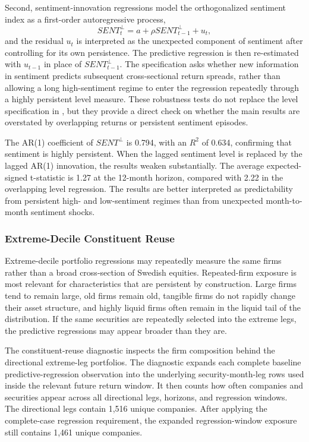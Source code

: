 \documentclass[11pt]{article}
\newcommand{\var}[1]{\ensuremath{#1}}
\begin{document}
Second, sentiment-innovation regressions model the orthogonalized sentiment index as a first-order autoregressive process,
\begin{equation}
    SENT^{\perp}_{t} = a + \rho SENT^{\perp}_{t-1} + u_t,
\end{equation}
and the residual \var{u_t} is interpreted as the unexpected component of sentiment after controlling for its own persistence. The predictive regression is then re-estimated with \var{u_{t-1}} in place of \var{SENT^{\perp}_{t-1}}. The specification asks whether new information in sentiment predicts subsequent cross-sectional return spreads, rather than allowing a long high-sentiment regime to enter the regression repeatedly through a highly persistent level measure. These robustness tests do not replace the level specification in \citet{baker2006sentiment}, but they provide a direct check on whether the main results are overstated by overlapping returns or persistent sentiment episodes.

The AR(1) coefficient of \var{SENT^{\perp}} is 0.794, with an \var{R^2} of 0.634, confirming that sentiment is highly persistent. When the lagged sentiment level is replaced by the lagged AR(1) innovation, the results weaken substantially. The average expected-signed t-statistic is 1.27 at the 12-month horizon, compared with 2.22 in the overlapping level regression. The results are better interpreted as predictability from persistent high- and low-sentiment regimes than from unexpected month-to-month sentiment shocks.

\subsubsection{Extreme-Decile Constituent Reuse}
Extreme-decile portfolio regressions may repeatedly measure the same firms rather than a broad cross-section of Swedish equities. Repeated-firm exposure is most relevant for characteristics that are persistent by construction. Large firms tend to remain large, old firms remain old, tangible firms do not rapidly change their asset structure, and highly liquid firms often remain in the liquid tail of the distribution. If the same securities are repeatedly selected into the extreme legs, the predictive regressions may appear broader than they are.

The constituent-reuse diagnostic inspects the firm composition behind the directional extreme-leg portfolios. The diagnostic expands each complete baseline predictive-regression observation into the underlying security-month-leg rows used inside the relevant future return window. It then counts how often companies and securities appear across all directional legs, horizons, and regression windows. The directional legs contain 1,516 unique companies. After applying the complete-case regression requirement, the expanded regression-window exposure still contains 1,461 unique companies.
\end{document}
